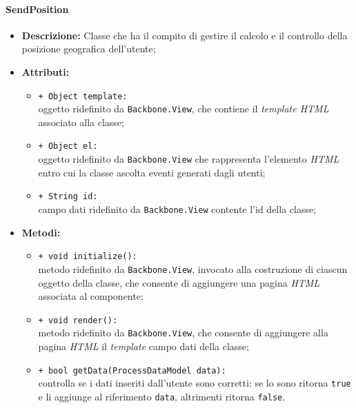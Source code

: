 \paragraph{SendPosition}
\begin{flushleft}
\begin{itemize}
\item \textbf{Descrizione:} Classe che ha il compito di gestire il calcolo e il controllo della posizione geografica dell'utente;
\item \textbf{Attributi:}
\begin{sloppypar}
\begin{itemize}
\item \texttt{+ Object template:}\\ oggetto ridefinito da \texttt{Backbone.View}, che contiene il \textit{template HTML} associato alla classe;
\item \texttt{+ Object el:}\\ oggetto ridefinito da \texttt{Backbone.View} che rappresenta l'elemento \textit{HTML} entro cui la classe ascolta eventi generati dagli utenti;
\item \texttt{+ String id:}\\ campo dati ridefinito da \texttt{Backbone.View} contente l'id della classe;
\end{itemize}
\end{sloppypar}
\item \textbf{Metodi:}
\begin{sloppypar}
\begin{itemize}
\item \texttt{+ void initialize():}\\ metodo ridefinito da \texttt{Backbone.View}, invocato alla costruzione di ciascun oggetto della classe, che consente di aggiungere una pagina \textit{HTML} associata al componente;
\item \texttt{+ void render():}\\ metodo ridefinito da \texttt{Backbone.View}, che consente di aggiungere alla pagina \textit{HTML} il \textit{template} campo dati della classe;
\item \texttt{+ bool getData(ProcessDataModel data):}\\ controlla se i dati inseriti dall'utente sono corretti: se lo sono ritorna \texttt{true} e li aggiunge al riferimento \texttt{data}, altrimenti ritorna \texttt{false}.
\end{itemize}
\end{sloppypar}
\end{itemize}
\end{flushleft}


